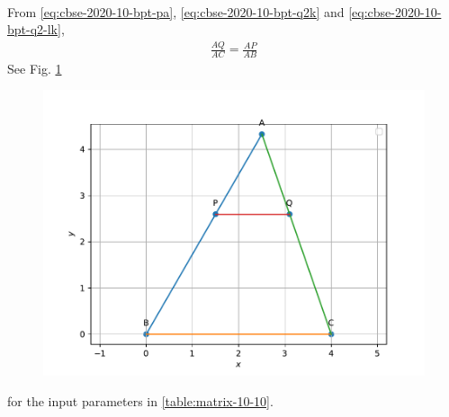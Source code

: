 \documentclass[journal,12pt,twocolumn]{IEEEtran}
\begin{document}
\begin{enumerate}
\begin{align}
		\end{align}
		From 
			\eqref{eq:cbse-2020-10-bpt-pa},  
			\eqref{eq:cbse-2020-10-bpt-q2k} and
			\eqref{eq:cbse-2020-10-bpt-q2-lk},
			\begin{align}
				\frac{AQ}{AC} = \frac{AP}{AB}
			\end{align}
    See Fig. 
	  \ref{fig:matrix-10-10.pdf}
  \begin{figure}
	  \centering 
	  \includegraphics[width=\columnwidth]{figs/matrix-10-10.pdf}
	  \caption{}
	  \label{fig:matrix-10-10.pdf}
	  \end{figure}
	  for the input parameters in 
\eqref{table:matrix-10-10}.	
\begin{table}[ht!]
	
\caption{}
\label{table:matrix-10-10}	
\end{table}
		

\end{enumerate}
\end{document}
